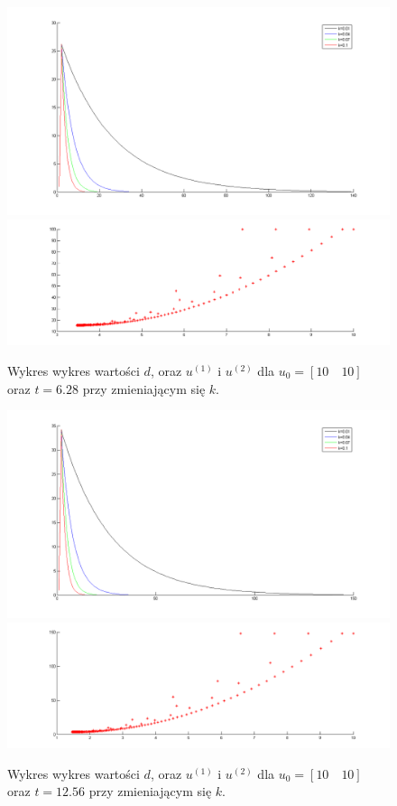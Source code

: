 \documentclass[a4paper,10pt]{article}
\begin{document}
\begin{figure}[!h]
    \centering
	\includegraphics[width=120mm]{CW4-alg2fun2-u10_10-k001_01-t628-d.png}
	\includegraphics[width=120mm]{CW4-alg2fun2-u10_10-k001_01-t628-u.png}
	\caption{Wykres wykres wartości $d$, oraz $u^{(1)}$ i $u^{(2)}$ dla $u_0=[10 \quad 10]$ oraz $t=6.28$ przy zmieniającym się $k$.}
    \label{fig:Rysunek}
\end{figure}
\begin{figure}[!h]
    \centering
	\includegraphics[width=120mm]{CW4-alg2fun2-u10_10-k001_01-t1256-d.png}
	\includegraphics[width=120mm]{CW4-alg2fun2-u10_10-k001_01-t1256-u.png}
	\caption{Wykres wykres wartości $d$, oraz $u^{(1)}$ i $u^{(2)}$ dla $u_0=[10 \quad 10]$ oraz $t=12.56$ przy zmieniającym się $k$.}
    \label{fig:Rysunek}
\end{figure}
\end{document}
